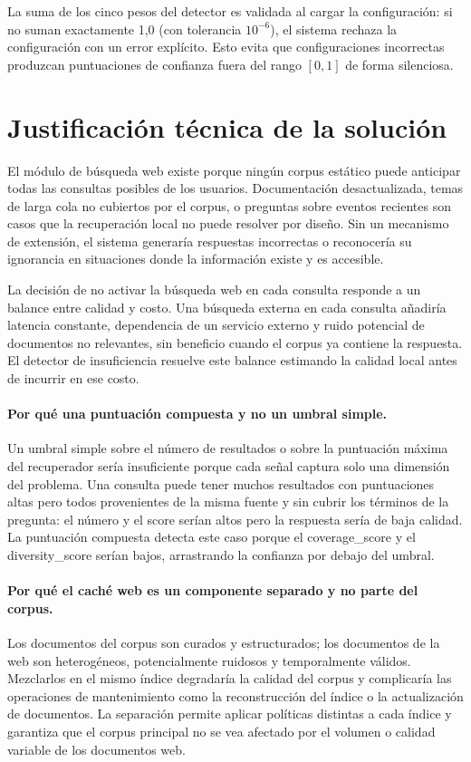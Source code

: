 \documentclass[11pt]{article}
\begin{document}
La suma de los cinco pesos del detector es validada al cargar la configuración: si no suman
exactamente 1,0 (con tolerancia $10^{-6}$), el sistema rechaza la configuración con un error
explícito. Esto evita que configuraciones incorrectas produzcan puntuaciones de confianza fuera
del rango $[0,1]$ de forma silenciosa.

\section{Justificación técnica de la solución}

El módulo de búsqueda web existe porque ningún corpus estático puede anticipar todas las
consultas posibles de los usuarios. Documentación desactualizada, temas de larga cola no
cubiertos por el corpus, o preguntas sobre eventos recientes son casos que la recuperación
local no puede resolver por diseño. Sin un mecanismo de extensión, el sistema generaría
respuestas incorrectas o reconocería su ignorancia en situaciones donde la información existe
y es accesible.

La decisión de no activar la búsqueda web en cada consulta responde a un balance entre calidad
y costo. Una búsqueda externa en cada consulta añadiría latencia constante, dependencia de un
servicio externo y ruido potencial de documentos no relevantes, sin beneficio cuando el corpus
ya contiene la respuesta. El detector de insuficiencia resuelve este balance estimando la
calidad local antes de incurrir en ese costo.

\paragraph{Por qué una puntuación compuesta y no un umbral simple.}
Un umbral simple sobre el número de resultados o sobre la puntuación máxima del recuperador
sería insuficiente porque cada señal captura solo una dimensión del problema. Una consulta
puede tener muchos resultados con puntuaciones altas pero todos provenientes de la misma fuente
y sin cubrir los términos de la pregunta: el número y el score serían altos pero la respuesta
sería de baja calidad. La puntuación compuesta detecta este caso porque el coverage\_score y
el diversity\_score serían bajos, arrastrando la confianza por debajo del umbral.

\paragraph{Por qué el caché web es un componente separado y no parte del corpus.}
Los documentos del corpus son curados y estructurados; los documentos de la web son
heterogéneos, potencialmente ruidosos y temporalmente válidos. Mezclarlos en el mismo índice
degradaría la calidad del corpus y complicaría las operaciones de mantenimiento como la
reconstrucción del índice o la actualización de documentos. La separación permite aplicar
políticas distintas a cada índice y garantiza que el corpus principal no se vea afectado por
el volumen o calidad variable de los documentos web.
\end{document}
